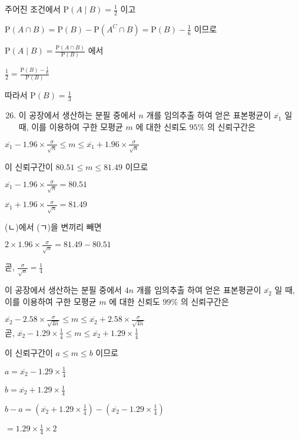 \documentclass[10pt]{article}
\begin{document}
주어진 조건에서 $\mathrm{P}(A \mid B)=\frac{1}{2}$ 이고

$\mathrm{P}(A \cap B)=\mathrm{P}(B)-\mathrm{P}\left(A^{C} \cap B\right)=\mathrm{P}(B)-\frac{1}{6}$ 이므로

$\mathrm{P}(A \mid B)=\frac{\mathrm{P}(A \cap B)}{\mathrm{P}(B)}$ 에서

$\frac{1}{2}=\frac{\mathrm{P}(B)-\frac{1}{6}}{\mathrm{P}(B)}$

따라서 $\mathrm{P}(B)=\frac{1}{3}$

\begin{enumerate}
  \setcounter{enumi}{25}
  \item 이 공장에서 생산하는 분필 중에서 $n$ 개를 임의추출 하여 얻은 표본평균이 $\overline{x_{1}}$ 일 때, 이를 이용하여 구한 모평균 $m$ 에 대한 신뢰도 $95 \%$ 의 신뢰구간은
\end{enumerate}

$\overline{x_{1}}-1.96 \times \frac{\sigma}{\sqrt{n}} \leq m \leq \overline{x_{1}}+1.96 \times \frac{\sigma}{\sqrt{n}}$

이 신뢰구간이 $80.51 \leq m \leq 81.49$ 이므로

$\overline{x_{1}}-1.96 \times \frac{\sigma}{\sqrt{n}}=80.51$

$\overline{x_{1}}+1.96 \times \frac{\sigma}{\sqrt{n}}=81.49$

(ㄴ)에서 (ㄱ)을 변끼리 빼면

$2 \times 1.96 \times \frac{\sigma}{\sqrt{n}}=81.49-80.51$

곧, $\frac{\sigma}{\sqrt{n}}=\frac{1}{4}$

이 공장에서 생산하는 분필 중에서 $4 n$ 개를 임의추출 하여 얻은 표본평균이 $\overline{x_{2}}$ 일 때, 이를 이용하여 구한 모평균 $m$ 에 대한 신뢰도 $99 \%$ 의 신뢰구간은

$\overline{x_{2}}-2.58 \times \frac{\sigma}{\sqrt{4 n}} \leq m \leq \overline{x_{2}}+2.58 \times \frac{\sigma}{\sqrt{4 n}}$\\
곧, $\overline{x_{2}}-1.29 \times \frac{1}{4} \leq m \leq \overline{x_{2}}+1.29 \times \frac{1}{4}$

이 신뢰구간이 $a \leq m \leq b$ 이므로

$a=\overline{x_{2}}-1.29 \times \frac{1}{4}$

$b=\overline{x_{2}}+1.29 \times \frac{1}{4}$

$b-a=\left(\overline{x_{2}}+1.29 \times \frac{1}{4}\right)-\left(\overline{x_{2}}-1.29 \times \frac{1}{4}\right)$

$=1.29 \times \frac{1}{4} \times 2$
\end{document}
